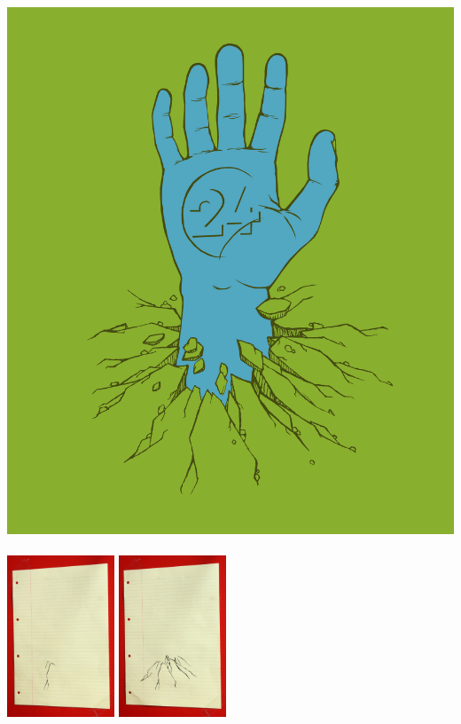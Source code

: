             
            \begin{center}           
                \includegraphics[width=\textwidth]{img/main.png}\\
                ~\\
                \includegraphics[width=0.24\textwidth]{img/IMG_5730.JPG}
                \includegraphics[width=0.24\textwidth]{img/IMG_5741.JPG}

\end{center}
